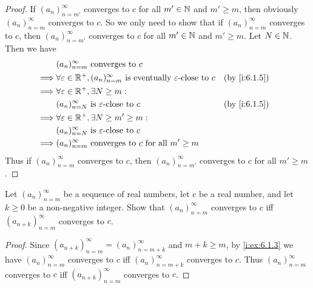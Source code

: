 \begin{proof}
  If \((a_n)_{n = m'}^\infty\) converges to \(c\) for all \(m' \in \mathbb{N}\) and \(m' \geq m\), then obviously \((a_n)_{n = m}^\infty\) converges to \(c\).
  So we only need to show that if \((a_n)_{n = m}^\infty\) converges to \(c\), then \((a_n)_{n = m'}^\infty\) converges to \(c\) for all \(m' \in \mathbb{N}\) and \(m' \geq m\).
  Let \(N \in \mathbb{N}\).
  Then we have
  \begin{align*}
             & (a_n)_{n = m}^\infty \text{ converges to } c                                                                               \\
    \implies & \forall \varepsilon \in \R^+, (a_n)_{n = m}^\infty \text{ is eventually } \varepsilon\text{-close to } c &  & \by{i:6.1.5} \\
    \implies & \forall \varepsilon \in \R^+, \exists N \geq m :                                                                           \\
             & (a_n)_{n = N}^\infty \text{ is } \varepsilon\text{-close to } c                                          &  & \by{i:6.1.5} \\
    \implies & \forall \varepsilon \in \R^+, \exists N \geq m' \geq m :                                                                   \\
             & (a_n)_{n = N}^\infty \text{ is } \varepsilon\text{-close to } c                                                            \\
    \implies & (a_n)_{n = m}^\infty \text{ converges to } c \text{ for all } m' \geq m
  \end{align*}
  Thus if \((a_n)_{n = m}^\infty\) converges to \(c\), then \((a_n)_{n = m'}^\infty\) converges to \(c\) for all \(m' \geq m\).
\end{proof}

\begin{ex}\label{i:ex:6.1.4}
  Let \((a_n)_{n = m}^\infty\) be a sequence of real numbers, let \(c\) be a real number, and let \(k \geq 0\) be a non-negative integer.
  Show that \((a_n)_{n = m}^\infty\) converges to \(c\) iff \((a_{n + k})_{n = m}^\infty\) converges to \(c\).
\end{ex}

\begin{proof}
  Since \((a_{n + k})_{n = m}^\infty = (a_n)_{n = m + k}^\infty\) and \(m + k \geq m\), by \cref{i:ex:6.1.3} we have \((a_n)_{n = m}^\infty\) converges to \(c\) iff \((a_n)_{n = m + k}^\infty\) converges to \(c\).
  Thus \((a_n)_{n = m}^\infty\) converges to \(c\) iff \((a_{n + k})_{n = m}^\infty\) converges to \(c\).
\end{proof}

